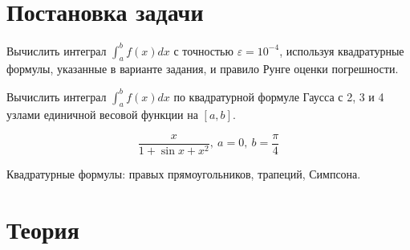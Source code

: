 \documentclass[12pt, a4paper]{article}
\begin{document}
	
	\begin{titlepage}
	\end{titlepage}
	
\tableofcontents
	
\section{Постановка задачи}

Вычислить интеграл $\int_{a}^{b}f(x)dx$ с точностью $\varepsilon = 10^{-4}$,
используя квадратурные формулы, указанные в варианте задания, и правило Рунге
оценки погрешности. 

Вычислить интеграл $\int_{a}^{b}f(x)dx$ по квадратурной формуле Гаусса с 2, 3 и
4 узлами единичной весовой функции на $[a, b]$. 

\begin{equation}
	\frac{x}{1 + \sin x + x^2},\ a = 0,\ b = \frac{\pi}{4}
	\label{eqn:task}
\end{equation}

Квадратурные формулы: правых прямоугольников, трапеций, Симпсона.

\section{Теория}
\end{document}
